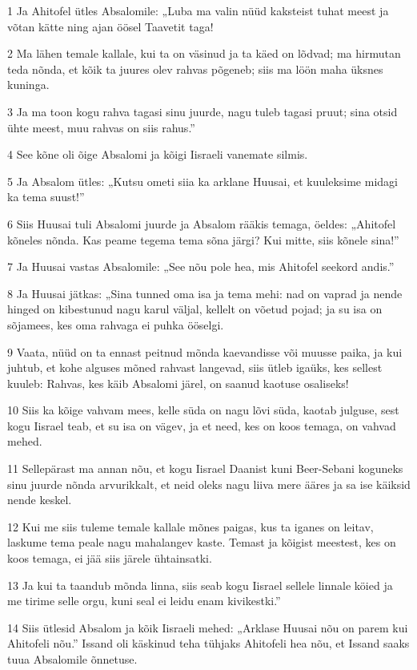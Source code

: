 \par 1 Ja Ahitofel ütles Absalomile: „Luba ma valin nüüd kaksteist tuhat meest ja võtan kätte ning ajan öösel Taavetit taga!
\par 2 Ma lähen temale kallale, kui ta on väsinud ja ta käed on lõdvad; ma hirmutan teda nõnda, et kõik ta juures olev rahvas põgeneb; siis ma löön maha üksnes kuninga.
\par 3 Ja ma toon kogu rahva tagasi sinu juurde, nagu tuleb tagasi pruut; sina otsid ühte meest, muu rahvas on siis rahus.”
\par 4 See kõne oli õige Absalomi ja kõigi Iisraeli vanemate silmis.
\par 5 Ja Absalom ütles: „Kutsu ometi siia ka arklane Huusai, et kuuleksime midagi ka tema suust!”
\par 6 Siis Huusai tuli Absalomi juurde ja Absalom rääkis temaga, öeldes: „Ahitofel kõneles nõnda. Kas peame tegema tema sõna järgi? Kui mitte, siis kõnele sina!”
\par 7 Ja Huusai vastas Absalomile: „See nõu pole hea, mis Ahitofel seekord andis.”
\par 8 Ja Huusai jätkas: „Sina tunned oma isa ja tema mehi: nad on vaprad ja nende hinged on kibestunud nagu karul väljal, kellelt on võetud pojad; ja su isa on sõjamees, kes oma rahvaga ei puhka ööselgi.
\par 9 Vaata, nüüd on ta ennast peitnud mõnda kaevandisse või muusse paika, ja kui juhtub, et kohe alguses mõned rahvast langevad, siis ütleb igaüks, kes sellest kuuleb: Rahvas, kes käib Absalomi järel, on saanud kaotuse osaliseks!
\par 10 Siis ka kõige vahvam mees, kelle süda on nagu lõvi süda, kaotab julguse, sest kogu Iisrael teab, et su isa on vägev, ja et need, kes on koos temaga, on vahvad mehed.
\par 11 Sellepärast ma annan nõu, et kogu Iisrael Daanist kuni Beer-Sebani koguneks sinu juurde nõnda arvurikkalt, et neid oleks nagu liiva mere ääres ja sa ise käiksid nende keskel.
\par 12 Kui me siis tuleme temale kallale mõnes paigas, kus ta iganes on leitav, laskume tema peale nagu mahalangev kaste. Temast ja kõigist meestest, kes on koos temaga, ei jää siis järele ühtainsatki.
\par 13 Ja kui ta taandub mõnda linna, siis seab kogu Iisrael sellele linnale köied ja me tirime selle orgu, kuni seal ei leidu enam kivikestki.”
\par 14 Siis ütlesid Absalom ja kõik Iisraeli mehed: „Arklase Huusai nõu on parem kui Ahitofeli nõu.” Issand oli käskinud teha tühjaks Ahitofeli hea nõu, et Issand saaks tuua Absalomile õnnetuse.
